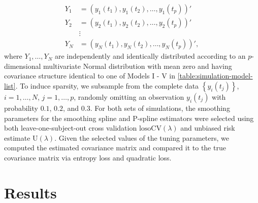 \begin{align*}
Y_1 &= \left(y_1\left(t_1\right), y_1\left(t_2\right), \dots, y_1\left(t_p\right)\right)' \\
Y_2 &= \left(y_2\left(t_1\right), y_2\left(t_2\right), \dots, y_2\left(t_p\right)\right)' \\
&\vdots \\
Y_N &= \left(y_N\left(t_1\right), y_N\left(t_2\right), \dots, y_N\left(t_p\right)\right)',
\end{align*}
\noindent
where $Y_1,\dots, Y_N$ are independently and identically distributed according to an $p$-dimensional multivariate Normal distribution with mean zero and having covariance structure identical to one of Models I - V in \ref{table:simulation-model-list}. To induce sparsity, we subsample from the complete data $\left\{y_i\left(t_j\right) \right\}$, $i = 1,\dots, N$, $j = 1,\dots, p$, randomly omitting an observation $y_i\left(t_j\right)$ with probability $0.1$, $0.2$, and $0.3$. For both sets of simulations, the smoothing parameters for the smoothing spline and P-spline estimators were selected using both leave-one-subject-out cross validation $\mbox{losoCV}\left(\lambda\right)$ and unbiased risk estimate $\mbox{U}\left(\lambda\right)$. Given the selected values of the tuning parameters, we computed the estimated covariance matrix and compared it to the true covariance matrix via entropy loss and quadratic loss. 


\section{Results}

